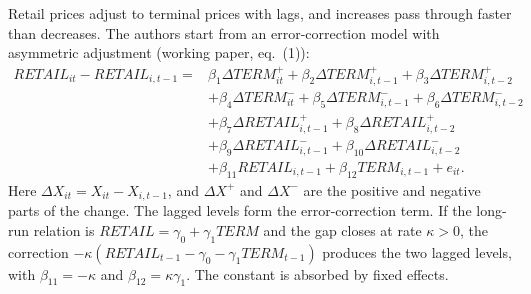 Retail prices adjust to terminal prices with lags, and increases pass through faster than decreases. The
authors start from an error-correction model with asymmetric adjustment (working paper, eq.~(1)):
\begin{equation}\label{eq:13-bs-ecm}
\begin{aligned}
\textit{RETAIL}_{it}-\textit{RETAIL}_{i,t-1}={}&\beta_1\Delta\textit{TERM}^{+}_{it}+\beta_2\Delta\textit{TERM}^{+}_{i,t-1}+\beta_3\Delta\textit{TERM}^{+}_{i,t-2}\\
&+\beta_4\Delta\textit{TERM}^{-}_{it}+\beta_5\Delta\textit{TERM}^{-}_{i,t-1}+\beta_6\Delta\textit{TERM}^{-}_{i,t-2}\\
&+\beta_7\Delta\textit{RETAIL}^{+}_{i,t-1}+\beta_8\Delta\textit{RETAIL}^{+}_{i,t-2}\\
&+\beta_9\Delta\textit{RETAIL}^{-}_{i,t-1}+\beta_{10}\Delta\textit{RETAIL}^{-}_{i,t-2}\\
&+\beta_{11}\textit{RETAIL}_{i,t-1}+\beta_{12}\textit{TERM}_{i,t-1}+e_{it}.
\end{aligned}
\end{equation}
Here $\Delta X_{it}=X_{it}-X_{i,t-1}$, and $\Delta X^{+}$ and $\Delta X^{-}$ are the positive and negative parts
of the change. The lagged levels form the error-correction term. If the long-run relation is
$\textit{RETAIL}=\gamma_0+\gamma_1\textit{TERM}$ and the gap closes at rate $\kappa>0$, the correction
$-\kappa(\textit{RETAIL}_{t-1}-\gamma_0-\gamma_1\textit{TERM}_{t-1})$ produces the two lagged levels, with
$\beta_{11}=-\kappa$ and $\beta_{12}=\kappa\gamma_1$. The constant is absorbed by fixed effects.

